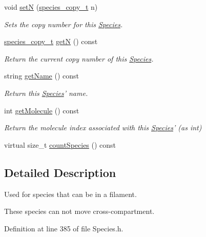 \begin{DoxyCompactItemize}
void \hyperlink{classSpecies_a88de7cf5130cb9cee2da3585374db654}{set\+N} (\hyperlink{common_8h_a3503f321fd36304ee274141275cca586}{species\+\_\+copy\+\_\+t} n)
\begin{DoxyCompactList}\small\item\em Sets the copy number for this \hyperlink{classSpecies}{Species}. \end{DoxyCompactList}\item 
\hyperlink{common_8h_a3503f321fd36304ee274141275cca586}{species\+\_\+copy\+\_\+t} \hyperlink{classSpecies_aea7327b3fed261c705b4d32b9973aa58}{get\+N} () const 
\begin{DoxyCompactList}\small\item\em Return the current copy number of this \hyperlink{classSpecies}{Species}. \end{DoxyCompactList}\item 
string \hyperlink{classSpecies_a28fa239dded841133760ff9c47af63a1}{get\+Name} () const 
\begin{DoxyCompactList}\small\item\em Return this \hyperlink{classSpecies}{Species}' name. \end{DoxyCompactList}\item 
int \hyperlink{classSpecies_a1ea8969c51bc69879891a408f9e197c7}{get\+Molecule} () const 
\begin{DoxyCompactList}\small\item\em Return the molecule index associated with this \hyperlink{classSpecies}{Species}' (as int) \end{DoxyCompactList}\item 
virtual size\+\_\+t \hyperlink{classSpecies_a1864e111fe0304ca8d6b2d0d955a7356}{count\+Species} () const 
\end{DoxyCompactItemize}


\subsection{Detailed Description}
Used for species that can be in a filament. 

These species can not move cross-\/compartment. 

Definition at line 385 of file Species.\+h.



